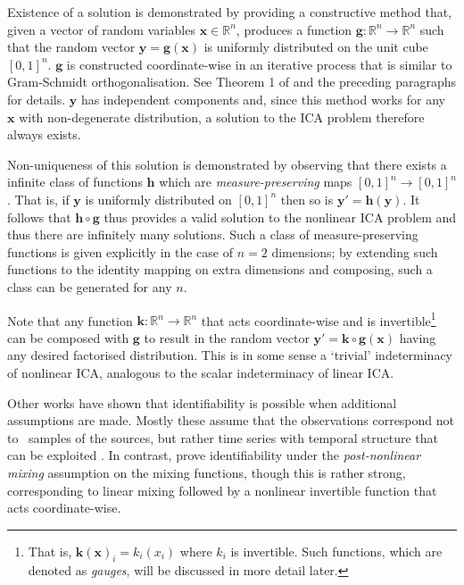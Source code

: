 Existence of a solution is demonstrated by providing a constructive method that, given a vector of random variables $\bm{x} \in \mathbb{R}^n$, produces a function $\bm{g}: \mathbb{R}^n \to \mathbb{R}^n$ such that the random vector $\bm{y} = \bm{g}(\bm{x}) $ is uniformly distributed on the unit cube $[0, 1]^n$.
$\bm{g}$ is constructed coordinate-wise in an iterative process that is similar to Gram-Schmidt orthogonalisation. See Theorem 1 of \cite{hyvarinen1999nonlinear} and the preceding paragraphs for details.
$\bm{y}$ has independent components and, since this method works for any $\bm{x}$ with non-degenerate distribution, a solution to the ICA problem therefore always exists.

Non-uniqueness of this solution is demonstrated by observing that there exists a infinite class of functions $\bm{h}$ which are \emph{measure-preserving} maps $[0,1]^n \to [0,1]^n$. 
That is, if $\bm{y}$ is uniformly distributed on $[0,1]^n$ then so is  $\bm{y}' = \bm{h}(\bm{y})$.
It follows that $\bm{h}\circ \bm{g}$ thus provides a valid solution to the nonlinear ICA problem and thus there are infinitely many solutions. 
Such a class of measure-preserving functions is given explicitly in the case of $n=2$ dimensions; by extending such functions to the identity mapping on extra dimensions and composing, such a class can be generated for any $n$.

Note that any function $\bm{k}: \mathbb{R}^n \to \mathbb{R}^n$ that acts coordinate-wise and is invertible\footnote{That is, $\bm{k}(\bm{x})_i = k_i(x_i)$ where $k_i$ is invertible. Such functions, which are denoted as \emph{gauges}, will be discussed in more detail later.} can be composed with $\bm{g}$ to result in the random vector $\bm{y}' = \bm{k}\circ \bm{g}(\bm{x})$ having any desired factorised distribution. 
This is in some sense a `trivial' indeterminacy of nonlinear ICA, analogous to the scalar indeterminacy of linear ICA.

Other works have shown that identifiability is possible when additional assumptions are made.
Mostly these assume that the observations correspond not to \iid~samples of the sources, but rather time series with temporal structure that can be exploited \cite{cardoso2001three, singer2008non, sprekeler2014extension}.
In contrast, \cite{taleb1999source} prove identifiability under the \emph{post-nonlinear mixing} assumption on the mixing functions, though this is rather strong, corresponding to linear mixing followed by a nonlinear invertible function that acts coordinate-wise.


